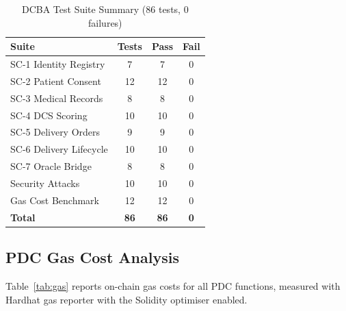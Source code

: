 \documentclass[sigplan,screen,review=false]{acmart}
\begin{document}
\begin{table}[h]
\centering
\caption{DCBA Test Suite Summary (86 tests, 0 failures)}
\label{tab:tests}
\begin{tabular}{@{}lccc@{}}
\toprule
\textbf{Suite} & \textbf{Tests} & \textbf{Pass} & \textbf{Fail} \\
\midrule
SC-1 Identity Registry  & 7  & 7  & 0 \\
SC-2 Patient Consent    & 12 & 12 & 0 \\
SC-3 Medical Records    & 8  & 8  & 0 \\
SC-4 DCS Scoring        & 10 & 10 & 0 \\
SC-5 Delivery Orders    & 9  & 9  & 0 \\
SC-6 Delivery Lifecycle & 10 & 10 & 0 \\
SC-7 Oracle Bridge      & 8  & 8  & 0 \\
Security Attacks        & 10 & 10 & 0 \\
Gas Cost Benchmark      & 12 & 12 & 0 \\
\midrule
\textbf{Total}          & \textbf{86} & \textbf{86} & \textbf{0} \\
\bottomrule
\end{tabular}
\end{table}

\subsection{PDC Gas Cost Analysis}

Table~\ref{tab:gas} reports on-chain gas costs for all PDC functions,
measured with Hardhat gas reporter with the Solidity optimiser enabled.
\end{document}
